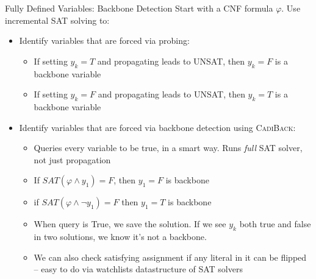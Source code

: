 \documentclass[aspectratio=169]{beamer}
\begin{document}
\begin{frame}{Fully Defined Variables: Backbone Detection}
Start with a CNF formula $ \varphi$. Use incremental SAT solving to:
\begin{itemize}
    \item Identify variables that are forced via probing:
        \begin{itemize}
            \item If setting $y_k = T$ and propagating leads to UNSAT, then
                $y_k = F$ is a backbone variable
            \item If setting $y_k = F$ and propagating leads to UNSAT, then
                $y_k = T$ is a backbone variable
        \end{itemize}
    \item Identify variables that are forced via backbone detection
        using \textsc{CadiBack}:
        \begin{itemize}
            \item Queries every variable to be true, in a smart way. Runs
                \emph{full} SAT solver, not just propagation
            \item If $SAT(\varphi \land y_1) = F$, then $y_1 = F$ is backbone
            \item if $SAT(\varphi \land \neg y_1) = F$ then $y_1 = T$ is backbone
            \item When query is True, we save the solution. If we see $y_k$ both
                true and false in two solutions, we know it's not a backbone.
            \item We can also check satisfying assignment if any literal
                in it can be flipped -- easy to do via watchlists
                datastructure of SAT solvers
        \end{itemize}
\end{itemize}
\end{frame}
\end{document}
